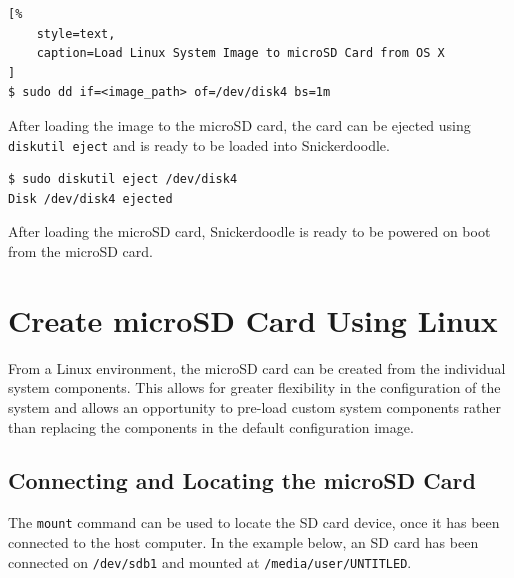 

\begin{lstlisting}[%
	style=text,
	caption=Load Linux System Image to microSD Card from OS X
]
$ sudo dd if=<image_path> of=/dev/disk4 bs=1m
\end{lstlisting}


After loading the image to the microSD card, the card can be ejected using \texttt{diskutil eject} and is ready to be loaded into Snickerdoodle.


\begin{lstlisting}	
$ sudo diskutil eject /dev/disk4
Disk /dev/disk4 ejected
\end{lstlisting}


After loading the microSD card, Snickerdoodle is ready to be powered on boot from the microSD card. %


\section{Create microSD Card Using Linux}

From a Linux environment, the microSD card can be created from the individual system components. This allows for greater flexibility in the configuration of the system and allows an opportunity to pre-load custom system components rather than replacing the components in the default configuration image.


\subsection{Connecting and Locating the microSD Card}

The \texttt{mount} command can be used to locate the SD card device, once it has been connected to the host computer. In the example below, an SD card has been connected on \texttt{/dev/sdb1} and mounted at \texttt{/media/user/UNTITLED}.


